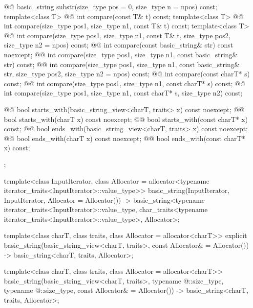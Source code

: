 \documentclass{wg21}
\begin{document}
\begin{codeblock}
{{    @@ basic_string substr(size_type pos = 0, size_type n = npos) const;
    template<class T>
      @@ int compare(const T& t) const;
    template<class T>
      @@ int compare(size_type pos1, size_type n1, const T& t) const;
    template<class T>
      @@ int compare(size_type pos1, size_type n1, const T& t,
                                      size_type pos2, size_type n2 = npos) const;
    @@ int compare(const basic_string& str) const noexcept;
    @@ int compare(size_type pos1, size_type n1, const basic_string& str) const;
    @@ int compare(size_type pos1, size_type n1, const basic_string& str,
                                    size_type pos2, size_type n2 = npos) const;
    @@ int compare(const charT* s) const;
    @@ int compare(size_type pos1, size_type n1, const charT* s) const;
    @@ int compare(size_type pos1, size_type n1, const charT* s, size_type n2) const;

    @@ bool starts_with(basic_string_view<charT, traits> x) const noexcept;
    @@ bool starts_with(charT x) const noexcept;
    @@ bool starts_with(const charT* x) const;
    @@ bool ends_with(basic_string_view<charT, traits> x) const noexcept;
    @@ bool ends_with(charT x) const noexcept;
    @@ bool ends_with(const charT* x) const;
  };

  template<class InputIterator,
           class Allocator = allocator<typename iterator_traits<InputIterator>::value_type>>
    basic_string(InputIterator, InputIterator, Allocator = Allocator())
      -> basic_string<typename iterator_traits<InputIterator>::value_type,
                      char_traits<typename iterator_traits<InputIterator>::value_type>,
                      Allocator>;

  template<class charT,
           class traits,
           class Allocator = allocator<charT>>
    explicit basic_string(basic_string_view<charT, traits>, const Allocator& = Allocator())
      -> basic_string<charT, traits, Allocator>;

  template<class charT,
           class traits,
           class Allocator = allocator<charT>>
    basic_string(basic_string_view<charT, traits>,
                 typename @\seebelow@::size_type, typename @\seebelow@::size_type,
                 const Allocator& = Allocator())
      -> basic_string<charT, traits, Allocator>;
}
\end{codeblock}
\end{document}
